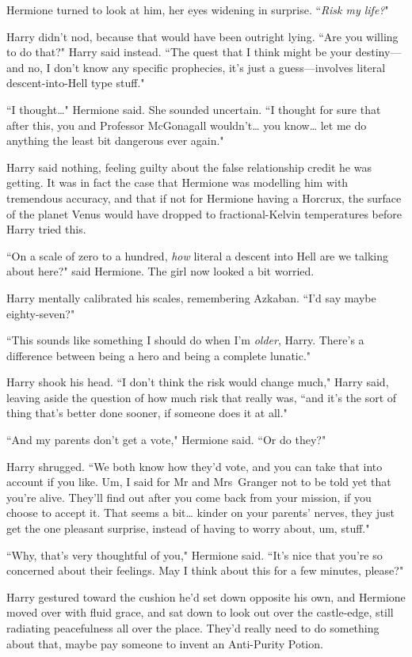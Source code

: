 Hermione turned to look at him, her eyes widening in surprise. ``\emph{Risk my life?}"

Harry didn't nod, because that would have been outright lying. ``Are you willing to do that?" Harry said instead. ``The quest that I think might be your destiny—and no, I don't know any specific prophecies, it's just a guess—involves literal descent-into-Hell type stuff."

``I thought{\ldots}" Hermione said. She sounded uncertain. ``I thought for sure that after this, you and Professor McGonagall wouldn't{\ldots} you know{\ldots} let me do anything the least bit dangerous ever again."

Harry said nothing, feeling guilty about the false relationship credit he was getting. It was in fact the case that Hermione was modelling him with tremendous accuracy, and that if not for Hermione having a Horcrux, the surface of the planet Venus would have dropped to fractional-Kelvin temperatures before Harry tried this.

``On a scale of zero to a hundred, \emph{how} literal a descent into Hell are we talking about here?" said Hermione. The girl now looked a bit worried.

Harry mentally calibrated his scales, remembering Azkaban. ``I'd say maybe eighty-seven?"

``This sounds like something I should do when I'm \emph{older}, Harry. There's a difference between being a hero and being a complete lunatic."

Harry shook his head. ``I don't think the risk would change much," Harry said, leaving aside the question of how much risk that really was, ``and it's the sort of thing that's better done sooner, if someone does it at all."

``And my parents don't get a vote," Hermione said. ``Or do they?"

Harry shrugged. ``We both know how they'd vote, and you can take that into account if you like. Um, I said for Mr and Mrs~Granger not to be told yet that you're alive. They'll find out after you come back from your mission, if you choose to accept it. That seems a bit{\ldots} kinder on your parents' nerves, they just get the one pleasant surprise, instead of having to worry about, um, stuff."

``Why, that's very thoughtful of you," Hermione said. ``It's nice that you're so concerned about their feelings. May I think about this for a few minutes, please?"

Harry gestured toward the cushion he'd set down opposite his own, and Hermione moved over with fluid grace, and sat down to look out over the castle-edge, still radiating peacefulness all over the place. They'd really need to do something about that, maybe pay someone to invent an Anti-Purity Potion.

